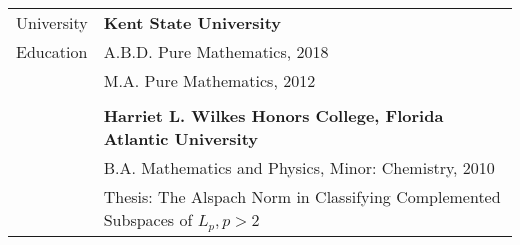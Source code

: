 \documentclass[letterpaper,10pt,oneside]{article}
\begin{document}
\vspace{0.1in}


\noindent \begin{tabular}{@{} l l}
 \Large{University} & \textbf{Kent State University} \\
 \Large{Education} & A.B.D. Pure Mathematics, 2018 \\
 \hspace{1.1in} & M.A. Pure Mathematics, 2012 \\
 & \\
 & \textbf{Harriet L. Wilkes Honors College, Florida Atlantic University} \\
 & B.A. Mathematics and Physics, Minor: Chemistry, 2010 \\
 & Thesis: The Alspach Norm in Classifying Complemented Subspaces of $L_p, p>2$ \\
\end{tabular}

\vfill

\end{document}
